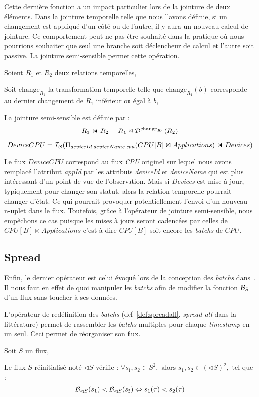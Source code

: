 Cette dernière fonction a un impact particulier lors de la jointure de deux éléments. Dans la jointure temporelle telle que nous l'avons définie, si un changement est appliqué d'un côté ou de l'autre, il y aura un nouveau calcul de jointure. Ce comportement peut ne pas être souhaité dans la pratique où nous pourrions souhaiter que seul une branche soit déclencheur de calcul et l'autre soit passive. La jointure semi-sensible permet cette opération.


\begin{defi}
    Soient $R_1$ et $R_2$ deux relations temporelles,

    Soit $\mathrm{change}_{R_1}$ la transformation temporelle telle que $\mathrm{change}_{R_1}(b)$ corresponde au dernier changement de $R_1$ inférieur ou égal à $b$,

    La jointure semi-sensible est définie par :
        $$R_1\ssjoin R_2 = R_1 \Join \D^{\mathrm{change}_{R_1}}(R_2)$$
\end{defi}
\begin{example}
    $$DeviceCPU=\IS(\Pi_{deviceId,deviceName,cpu}(CPU[B]\Join Applications)\ssjoin Devices)$$

Le flux $DeviceCPU$ correspond au flux \textit{CPU} originel sur lequel nous avons remplacé l'attribut \textit{appId} par les attributs \textit{deviceId} et \textit{deviceName} qui est plus intéressant d'un point de vue de l'observation. Mais si \textit{Devices} est mise à jour, typiquement pour changer son statut, alors la relation temporelle pourrait changer d'état. Ce qui pourrait provoquer potentiellement l'envoi d'un nouveau n-uplet dans le flux. Toutefois, grâce à l'opérateur de jointure semi-sensible, nous empêchons ce cas puisque les mises à jours seront cadencées par celles de $CPU[B]\Join Applications$ c'est à dire $CPU[B]$ soit encore les \textit{batchs} de $CPU$.
\end{example}

\subsection{Spread}
Enfin, le dernier opérateur est celui évoqué lors de la conception des \textit{batchs} dans~\cite{Jain:spread}. Il nous faut en effet de quoi manipuler les \textit{batchs} afin de modifier la fonction $\mathcal{B}_S$ d'un flux sans toucher à ses données.

L'opérateur de redéfinition des \textit{batchs} (def~\ref{def:spreadall}, \textit{spread all} dans la littérature) permet de rassembler les \textit{batchs} multiples pour chaque \textit{timestamp} en un seul. Ceci permet de réorganiser son flux.
\begin{defi}\label{def:spreadall}
Soit $S$ un flux,

Le flux $S$ réinitialisé noté $\lhd S$ vérifie :
$\forall s_1, s_2\in S^2, \textrm{ alors } s_1, s_2 \in (\lhd S)^2,$ tel que :
$$\mathcal{B}_{\lhd S}(s_1) < \mathcal{B}_{\lhd S}(s_2) \Leftrightarrow s_1(\tau) < s_2(\tau)$$
\end{defi}

